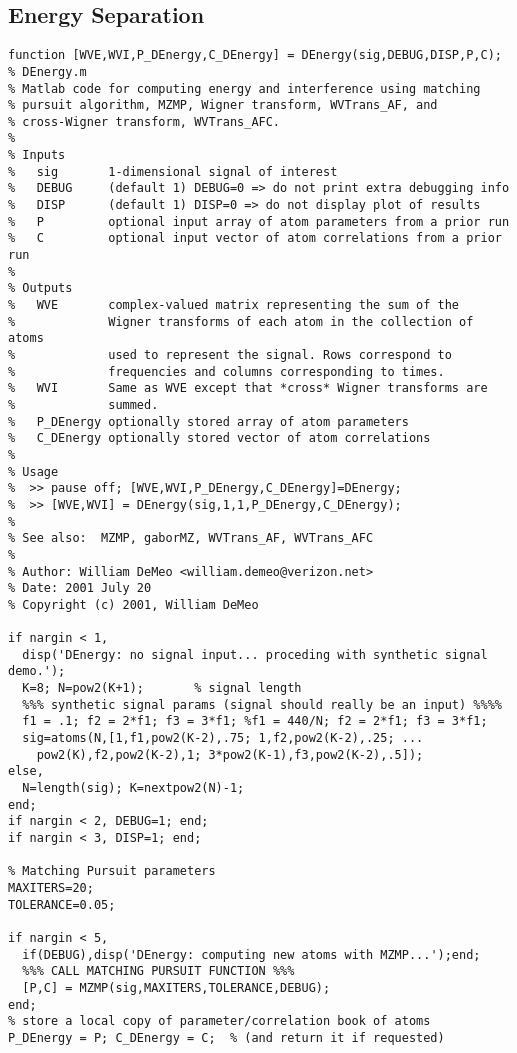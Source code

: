 \subsection{Energy Separation}\label{sec:DEnergy}
\begin{verbatim}
function [WVE,WVI,P_DEnergy,C_DEnergy] = DEnergy(sig,DEBUG,DISP,P,C);
% DEnergy.m
% Matlab code for computing energy and interference using matching
% pursuit algorithm, MZMP, Wigner transform, WVTrans_AF, and
% cross-Wigner transform, WVTrans_AFC.
%
% Inputs
%   sig       1-dimensional signal of interest
%   DEBUG     (default 1) DEBUG=0 => do not print extra debugging info
%   DISP      (default 1) DISP=0 => do not display plot of results
%   P         optional input array of atom parameters from a prior run
%   C         optional input vector of atom correlations from a prior run 
%
% Outputs
%   WVE       complex-valued matrix representing the sum of the
%             Wigner transforms of each atom in the collection of atoms
%             used to represent the signal. Rows correspond to
%             frequencies and columns corresponding to times.
%   WVI       Same as WVE except that *cross* Wigner transforms are
%             summed.
%   P_DEnergy optionally stored array of atom parameters
%   C_DEnergy optionally stored vector of atom correlations
%
% Usage
%  >> pause off; [WVE,WVI,P_DEnergy,C_DEnergy]=DEnergy;
%  >> [WVE,WVI] = DEnergy(sig,1,1,P_DEnergy,C_DEnergy);
%
% See also:  MZMP, gaborMZ, WVTrans_AF, WVTrans_AFC
%
% Author: William DeMeo <william.demeo@verizon.net>
% Date: 2001 July 20
% Copyright (c) 2001, William DeMeo

if nargin < 1, 
  disp('DEnergy: no signal input... proceding with synthetic signal demo.');
  K=8; N=pow2(K+1);       % signal length
  %%% synthetic signal params (signal should really be an input) %%%%
  f1 = .1; f2 = 2*f1; f3 = 3*f1; %f1 = 440/N; f2 = 2*f1; f3 = 3*f1;
  sig=atoms(N,[1,f1,pow2(K-2),.75; 1,f2,pow2(K-2),.25; ...
    pow2(K),f2,pow2(K-2),1; 3*pow2(K-1),f3,pow2(K-2),.5]);
else,  
  N=length(sig); K=nextpow2(N)-1; 
end;
if nargin < 2, DEBUG=1; end;
if nargin < 3, DISP=1; end;

% Matching Pursuit parameters
MAXITERS=20; 
TOLERANCE=0.05;

if nargin < 5,
  if(DEBUG),disp('DEnergy: computing new atoms with MZMP...');end;
  %%% CALL MATCHING PURSUIT FUNCTION %%%
  [P,C] = MZMP(sig,MAXITERS,TOLERANCE,DEBUG);
end;
% store a local copy of parameter/correlation book of atoms 
P_DEnergy = P; C_DEnergy = C;  % (and return it if requested)


\end{verbatim}
